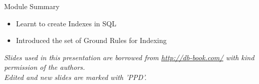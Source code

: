 \documentclass[aspectratio=169, xcolor=dvipsnames]{beamer}
\begin{document}
\begin{frame}{Module Summary}
    \begin{block}{}
        \begin{itemize}[<+->]
            \item Learnt to create Indexes in SQL
            \item Introduced the set of Ground Rules for Indexing
        \end{itemize}
    \end{block}
    \vspace{2em}
    \begin{center}
    \small \textit{Slides used in this presentation are borrowed from \url{http://db-book.com/} with kind permission of the authors.} \\
    \small \textit{Edited and new slides are marked with 'PPD'.}
    \end{center}
\end{frame}
\end{document}
